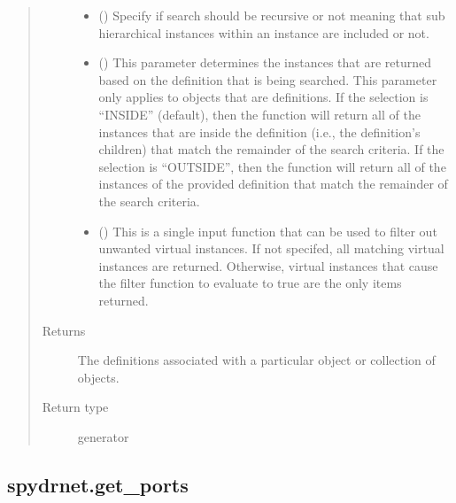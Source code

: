 \documentclass[letterpaper,10pt,english,openany,oneside]{sphinxmanual}
\begin{document}
\begin{fulllineitems}
\begin{quote}
\begin{description}
\begin{itemize}
\item {} 
 () \textendash{} Specify if search should be recursive or not meaning that sub hierarchical instances within an instance are
included or not.

\item {} 
 () \textendash{} This parameter determines the instances that are returned based on the definition that is being searched. This
parameter only applies to objects that are definitions. If the selection is “INSIDE” (default), then the
function will return all of the instances that are inside the definition (i.e., the definition’s children) that
match the remainder of the search criteria. If the selection is “OUTSIDE”, then the function will return all of
the instances of the provided definition that match the remainder of the search criteria.

\item {} 
 () \textendash{} This is a single input function that can be used to filter out unwanted virtual instances. If not specifed, all
matching virtual instances are returned. Otherwise, virtual instances that cause the filter function to evaluate
to true are the only items returned.

\end{itemize}

\item[{Returns}] \leavevmode
{} \textendash{} The definitions associated with a particular object or collection of objects.

\item[{Return type}] \leavevmode
generator

\end{description}\end{quote}

\end{fulllineitems}



\subsection{spydrnet.get\_ports}
\label{\detokenize{reference/classes/generated/spydrnet.get_ports:spydrnet-get-ports}}\label{\detokenize{reference/classes/generated/spydrnet.get_ports::doc}}
\end{document}
